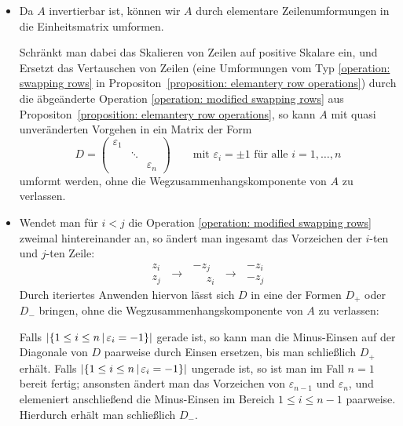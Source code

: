 \begin{itemize}
  \item
    Da $A$ invertierbar ist, können wir $A$ durch elementare Zeilenumformungen in die Einheitsmatrix umformen.
    
    Schränkt man dabei das Skalieren von Zeilen auf positive Skalare ein, und Ersetzt das Vertauschen von Zeilen (eine Umformungen vom Typ \ref{operation: swapping rows} in Propositon~\ref{proposition: elemantery row operations}) durch die äbgeänderte Operation \ref{operation: modified swapping rows} aus Propositon~\ref{proposition: elemantery row operations}, so kann $A$ mit quasi unveränderten Vorgehen in ein Matrix der Form
    \[
        D
      = \begin{pmatrix}
          \varepsilon_1 &         &               \\
                        & \ddots  &               \\
                        &         & \varepsilon_n
        \end{pmatrix}
      \qquad
      \text{mit $\varepsilon_i = \pm 1$ für alle $i = 1, \dotsc, n$}
    \]
    umformt werden, ohne die Wegzusammenhangskomponente von $A$ zu verlassen.
    
  \item
    Wendet man für $i < j$ die Operation \ref{operation: modified swapping rows} zweimal hintereinander an, so ändert man ingesamt das Vorzeichen der $i$-ten und $j$-ten Zeile:
    \[
      \begin{matrix}
        z_i \\ z_j
      \end{matrix}
      \;\to\;
      \begin{matrix}
        -z_j \\ \phantom{-}z_i
      \end{matrix}
      \;\to\;
      \begin{matrix}
        -z_i \\ -z_j
      \end{matrix}
    \]
    Durch iteriertes Anwenden hiervon lässt sich $D$ in eine der Formen $D_+$ oder $D_-$ bringen, ohne die Wegzusammenhangskomponente von $A$ zu verlassen:
    
    Falls $|\{1 \leq i \leq n \,|\, \varepsilon_i = -1\}|$ gerade ist, so kann man die Minus-Einsen auf der Diagonale von $D$ paarweise durch Einsen ersetzen, bis man schließlich $D_+$ erhält.
    Falls $|\{1 \leq i \leq n \,|\, \varepsilon_i = -1\}|$  ungerade ist, so ist man im Fall $n = 1$ bereit fertig; ansonsten ändert man das Vorzeichen von $\varepsilon_{n-1}$ und $\varepsilon_n$, und elemeniert anschließend die Minus-Einsen im Bereich $1 \leq i \leq n-1$ paarweise.
    Hierdurch erhält man schließlich $D_-$.
\end{itemize}

